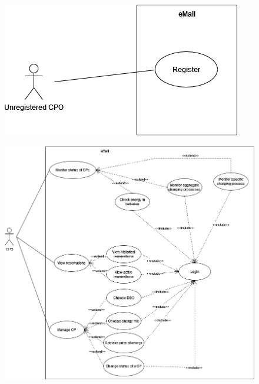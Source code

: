 \begin{figure}[H]
    \centering
    \includegraphics[scale=0.6]{src/use_case_diagram/cpo_registration.png}
\end{figure}

\begin{figure}[H]
    \centering
    \includegraphics[scale=0.5]{src/use_case_diagram/cpo.png}
\end{figure}

